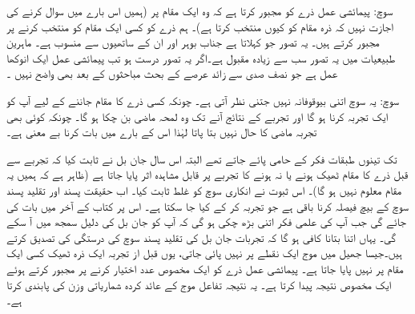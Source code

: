 \quad {}
 سوچ:  پیمائشی عمل ذرے کو مجبور کرتا ہے کہ وہ ایک مقام پر  (ہمیں اس بارے میں سوال کرنے کی اجازت نہیں     کہ ذرہ  مقام  کو کیوں منتخب کرتا ہے)۔    ہم ذرے کو کسی ایک مقام کو منتخب کرنے پر مجبور کرتے ہیں۔   یہ تصور جو  کہلاتا ہے  جناب بوہر اور ان کے ساتھیوں سے منسوب   ہے۔ ماہرین  طبیعیات میں یہ تصور سب سے زیادہ مقبول ہے۔اگر یہ  تصور  درست ہو تب پیمائشی عمل ایک انوکھا عمل ہے جو نصف صدی سے زائد عرصے  کے بحث   مباحثوں کے بعد  بھی واضح نہیں ۔

\quad {}
 سوچ:  یہ سوچ اتنی بیوقوفانہ نہیں  جتنی نظر آتی ہے۔ چونکہ کسی ذرے کا مقام جاننے کے لیے آپ کو ایک تجربہ کرنا ہو گا اور تجربے کے نتائج آنے تک وہ لمحہ  ماضی  بن چکا ہو گا۔ چونکہ کوئی بھی تجربہ ماضی کا حال نہیں  بتا پاتا لہٰذا اس کے بارے میں بات کرنا بے معنی ہے۔  

      تک تینوں طبقات   فکر    کے حامی پائے جاتے تھے البتہ اس سال   جان بل نے  ثابت کیا کہ تجربے سے قبل   ذرے  کا مقام ٹھیک  ہونے یا   نہ  ہونے کا  تجربے  پر قابل مشاہدہ اثر پایا جاتا ہے (ظاہر ہے کہ ہمیں یہ مقام معلوم نہیں ہو گا)۔ اس ثبوت نے انکاری سوچ کو غلط ثابت کیا۔ اب حقیقت پسند اور تقلید پسند سوچ کے بیچ   فیصلہ کرنا باقی ہے جو تجربہ کر کے کیا جا سکتا ہے۔ اس پر کتاب کے آخر میں بات کی جائے گی جب آپ کی علمی فکر  اتنی بڑھ چکی ہو گی کہ آپ کو   جان بل کی دلیل سمجھ میں  آ سکے گی۔ یہاں اتنا بتانا کافی ہو گا کہ تجربات  جان بل کی تقلید پسند سوچ کی درستگی کی تصدیق کرتے ہیں۔جیسا جھیل میں  موج ایک نقطے  پر نہیں پائی جاتی،  یوں  قبل از تجربہ  ایک ذرہ ٹھیک کسی  ایک مقام پر  نہیں پایا جاتا ہے۔  پیمائشی عمل ذرے کو ایک مخصوص عدد اختیار کرنے پر مجبور کرتے ہوئے  ایک مخصوص نتیجہ پیدا کرتا ہے۔ یہ نتیجہ تفاعل موج کے  عائد  کردہ شماریاتی وزن کی پابندی کرتا ہے۔

